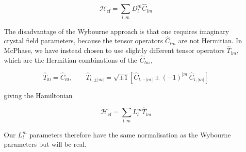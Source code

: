 \[
\mathcal{H}_{\mathrm{cf}} = \sum_{l,m} D_l^{m} \hat{C}_{lm}
\]

The disadvantage of the Wybourne approach is that one requires imaginary crystal field parameters, because the
tensor operators $\hat{C}_{lm}$ are not Hermitian. In {\prg McPhase}, we have instead chosen to use slightly
different tensor operators $\hat{T}_{lm}$, which are the Hermitian combinations of the $\hat{C}_{lm}$,

\[
  \hat{T}_{l0} = \hat{C}_{l0}, \qquad \hat{T}_{l,\pm|m|} = \sqrt{\pm 1} \left[ \hat{C}_{l,-|m|} \pm (-1)^{|m|} \hat{C}_{l,|m|} \right]
\]

\noindent giving the Hamiltonian

\[
\mathcal{H}_{\mathrm{cf}} = \sum_{l,m} L_l^m \hat{T}_{lm}
\]

Our $L_l^m$ parameters therefore have the same normalisation as the Wybourne parameters but will be real.

